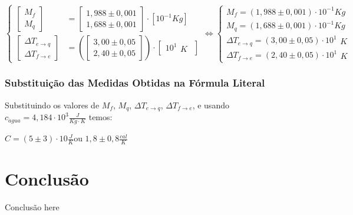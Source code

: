 \documentclass[a4paper]{article}
\begin{document}
			\[
			\begin{cases}
				\left[\begin{array}{c}
					M_{f}\\
					M_{q}
				\end{array}\right] & =\left[\begin{array}{c}
					1,988\pm0,001\\
					1,688\pm0,001
				\end{array}\right]\cdot\left[10^{-1}Kg\right]\\
				\left[\begin{array}{c}
					\Delta T_{e\rightarrow q}\\
					\Delta T_{f\rightarrow e}
				\end{array}\right] & =\left(\left[\begin{array}{c}
					3,00\pm0,05\\
					2,40\pm0,05
				\end{array}\right]\right)\cdot\left[\begin{array}{c}
					10^{1}\begin{array}{c}
					K\end{array}\end{array}\right]
			\end{cases}\Longleftrightarrow\begin{cases}
				M_{f}=\left(1,988\pm0,001\right)\cdot10^{-1}\unit{Kg}\\
				M_{q}=\left(1,688\pm0,001\right)\cdot10^{-1}\unit{Kg}\\
				\Delta T_{e\rightarrow q}=\left(3,00\pm0,05\right)\cdot10^{1}\begin{array}{c}
				\unit{K}\end{array}\\
				\Delta T_{f\rightarrow e}=\left(2,40\pm0,05\right)\cdot10^{1}\begin{array}{c}
				\unit{K}\end{array}
			\end{cases}
			\]

		\subsubsection{Substituição das Medidas Obtidas na Fórmula Literal}

			Substituindo os valores de $M_{f}$, $M_{q}$, $\Delta T_{e\rightarrow q}$,
			$\Delta T_{f\rightarrow e}$, e usando $c_{\acute{a}gua}=4,184\cdot10^{3}\unit{\frac{J}{Kg\cdot K}}$
			temos:

			$C=\left(5\pm3\right)\cdot10\unit{\frac{J}{K}}$ou $1,8\pm0,8\unit{\frac{cal}{K}}$

\section{Conclusão}
	Conclusão here 
\end{document}
